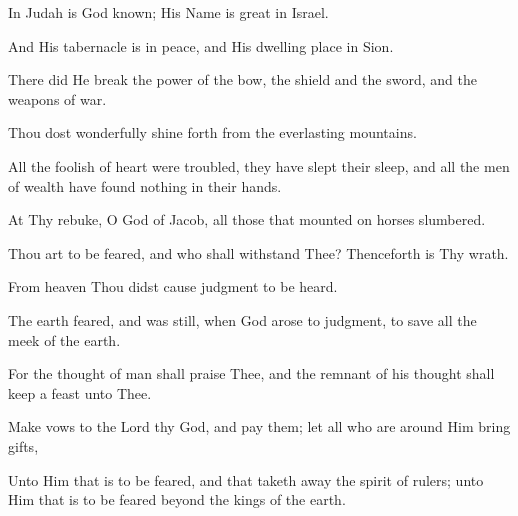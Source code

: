 In Judah is God known; His Name is great in Israel.

And His tabernacle is in peace, and His dwelling place in Sion.

There did He break the power of the bow, the shield and the sword, and the weapons of war.

Thou dost wonderfully shine forth from the everlasting mountains.

All the foolish of heart were troubled, they have slept their sleep, and all the men of wealth have found nothing in their hands.

At Thy rebuke, O God of Jacob, all those that mounted on horses slumbered.

Thou art to be feared, and who shall withstand Thee? Thenceforth is Thy wrath.

From heaven Thou didst cause judgment to be heard.

The earth feared, and was still, when God arose to judgment, to save all the meek of the earth.

For the thought of man shall praise Thee, and the remnant of his thought shall keep a feast unto Thee.

Make vows to the Lord thy God, and pay them; let all who are around Him bring gifts,

Unto Him that is to be feared, and that taketh away the spirit of rulers; unto Him that is to be feared beyond the kings of the earth.
